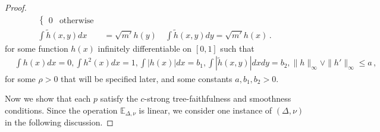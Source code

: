 \documentclass{article}
\theoremstyle{definition}
\theoremstyle{definition}
\theoremstyle{definition}
\theoremstyle{definition}
\theoremstyle{definition}
\theoremstyle{definition}
\theoremstyle{remark}
\theoremstyle{remark}
\newcommand{\E}{\mathbb{E}}
\begin{document}
\begin{proof}
\begin{align*}
\begin{cases}
            0 & \text{otherwise}
        \end{cases} \\
        \int \widetilde{h}(x,y) dx & = \sqrt{m'}h(y) \quad \int \widetilde{h}(x,y) dy = \sqrt{m'}h(x)  \,.
    \end{align*}
    for some function $h(x)$ infinitely differentiable on $[0,1]$ such that
    \begin{align*}
        &\int h(x) dx = 0, \int h^2(x)dx  = 1, \int |h(x)| dx = b_1, \int |\widetilde{h}(x,y)|dxdy = b_2, \|h\|_{\infty}\vee\|h'\|_{\infty}\le a \,,
    \end{align*}
    for some $\rho > 0$ that will be specified later, and some constants $a,b_1,b_2>0$.

    Now we show that each $p$ satisfy the $c$-strong tree-faithfulness and smoothness conditions. Since the operation $\E_{\Delta,\nu}$ is linear, we consider one instance of $(\Delta,\nu)$ in the following discussion. 
    

\end{proof}
\end{document}
